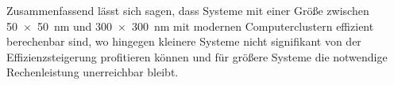 Zusammenfassend lässt sich sagen, dass Systeme mit einer Größe zwischen \SI{50x50}{\nano\meter} und \SI{300x300}{\nano\meter} mit modernen Computerclustern effizient berechenbar sind, wo hingegen kleinere Systeme nicht signifikant von der Effizienzsteigerung profitieren können und für größere Systeme die notwendige Rechenleistung unerreichbar bleibt.
